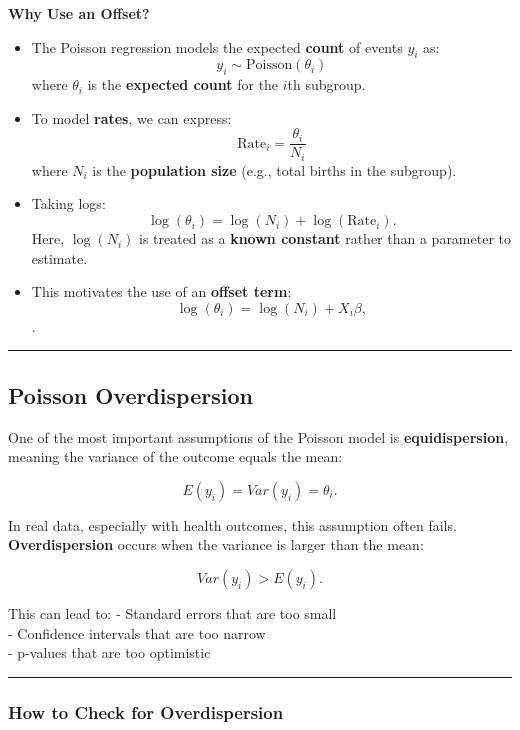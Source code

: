 \documentclass[
  letterpaper,
  DIV=11,
  numbers=noendperiod]{scrreprt}
\begin{document}
\textbf{Why Use an Offset?}

\begin{itemize}
\item
  The Poisson regression models the expected \textbf{count} of events
  \(y_i\) as: \[
  y_i \sim \text{Poisson}(\theta_i)
  \] where \(\theta_i\) is the \textbf{expected count} for the \(i\)th
  subgroup.
\item
  To model \textbf{rates}, we can express: \[
  \text{Rate}_i = \frac{\theta_i}{N_i}
  \] where \(N_i\) is the \textbf{population size} (e.g., total births
  in the subgroup).
\item
  Taking logs: \[
  \log(\theta_i) = \log(N_i) + \log(\text{Rate}_i).
  \] Here, \(\log(N_i)\) is treated as a \textbf{known constant} rather
  than a parameter to estimate.
\item
  This motivates the use of an \textbf{offset term}: \[
  \log(\theta_i) = \log(N_i) + X_i \beta,
  \].
\end{itemize}

\begin{center}\rule{0.5\linewidth}{0.5pt}\end{center}

\hypertarget{poisson-overdispersion}{%
\subsection*{Poisson Overdispersion}\label{poisson-overdispersion}}

One of the most important assumptions of the Poisson model is
\textbf{equidispersion}, meaning the variance of the outcome equals the
mean:

\[
E(y_i) = Var(y_i) = \theta_i.
\]

In real data, especially with health outcomes, this assumption often
fails. \textbf{Overdispersion} occurs when the variance is larger than
the mean:

\[
Var(y_i) > E(y_i).
\]

This can lead to: - Standard errors that are too small\\
- Confidence intervals that are too narrow\\
- p-values that are too optimistic

\begin{center}\rule{0.5\linewidth}{0.5pt}\end{center}

\hypertarget{how-to-check-for-overdispersion}{%
\subsubsection*{How to Check for
Overdispersion}\label{how-to-check-for-overdispersion}}
\end{document}
